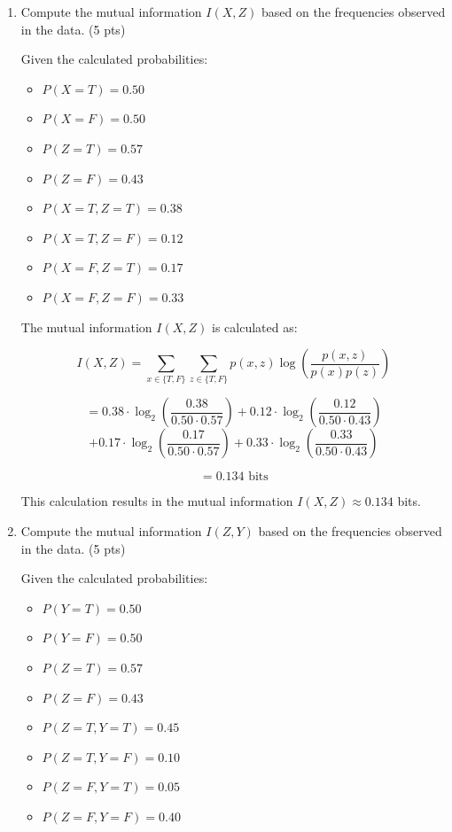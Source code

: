 \documentclass[a4paper]{article}
\theoremstyle{definition}
\newenvironment{soln}{
	\leavevmode\color{blue}\ignorespaces
}{}
\begin{document}
\begin{enumerate}
\begin{soln}
	\end{soln}
	\item Compute the mutual information $I(X, Z)$ based on the frequencies observed in the data. (5 pts)
	\begin{soln}
		Given the calculated probabilities:
		\begin{itemize}
			\item $P(X=T) = 0.50$
			\item $P(X=F) = 0.50$
			\item $P(Z=T) = 0.57$
			\item $P(Z=F) = 0.43$
			\item $P(X=T, Z=T) = 0.38$
			\item $P(X=T, Z=F) = 0.12$
			\item $P(X=F, Z=T) = 0.17$
			\item $P(X=F, Z=F) = 0.33$
		\end{itemize}

		The mutual information $I(X, Z)$ is calculated as:

		\[
		I(X, Z) = \sum_{x \in \{T, F\}} \sum_{z \in \{T, F\}} p(x, z) \log\left(\frac{p(x, z)}{p(x)p(z)}\right)
		\]

		\[
		= 0.38 \cdot \log_2\left(\frac{0.38}{0.50 \cdot 0.57}\right) + 0.12 \cdot \log_2\left(\frac{0.12}{0.50 \cdot 0.43}\right)
		\]
		\[
		+ 0.17 \cdot \log_2\left(\frac{0.17}{0.50 \cdot 0.57}\right) + 0.33 \cdot \log_2\left(\frac{0.33}{0.50 \cdot 0.43}\right)
		\]

		\[
		= 0.134 \text{ bits}
		\]

		This calculation results in the mutual information $I(X, Z) \approx 0.134$ bits.


	\end{soln}
	\item Compute the mutual information $I(Z, Y)$ based on the frequencies observed in the data. (5 pts)
	\begin{soln}
		Given the calculated probabilities:
		\begin{itemize}
			\item $P(Y=T) = 0.50$
			\item $P(Y=F) = 0.50$
			\item $P(Z=T) = 0.57$
			\item $P(Z=F) = 0.43$
			\item $P(Z=T, Y=T) = 0.45$
			\item $P(Z=T, Y=F) = 0.10$
			\item $P(Z=F, Y=T) = 0.05$
			\item $P(Z=F, Y=F) = 0.40$
		\end{itemize}


\end{soln}
\end{enumerate}
\end{document}
